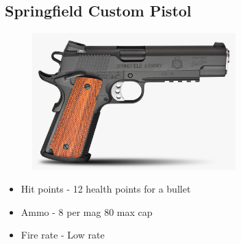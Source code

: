         \subsection{Springfield Custom Pistol}
        \begin{figure}[H]
            \centering
            \includegraphics[width=0.7\textwidth]{images/weapons/custom}
        \end{figure}
        \begin{itemize}
            \item Hit points - 12 health points for a bullet
            \item Ammo - 8 per mag 80 max cap
            \item Fire rate - Low rate
        \end{itemize}
